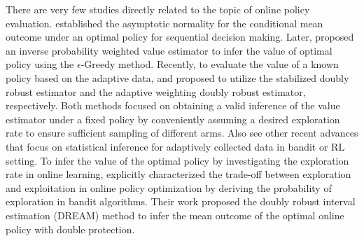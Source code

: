 There are very few studies directly related to the topic of online policy evaluation. \cite{chambaz2017targeted} established the asymptotic normality for the conditional mean outcome under an optimal policy for sequential decision making.  Later, \cite{chen2020statistical} proposed an inverse probability weighted value estimator to infer the value of optimal policy using the $\epsilon$-Greedy method. %
Recently, to evaluate the value of a known policy based on the adaptive data, %
\citet{bibaut2021post} and \citet{zhan2021off} proposed to utilize the stabilized doubly robust estimator and the adaptive weighting doubly robust estimator, respectively. Both methods focused on obtaining a valid inference of the value estimator under a fixed policy by conveniently assuming a desired exploration rate to ensure sufficient sampling of different arms. %
Also see other recent advances that focus on statistical inference for adaptively collected data \citep{dimakopoulou2021online,zhang2021statistical,khamaru2021near,ramprasad2022online} in bandit or \acrshort{RL} setting. 
To infer the value of the optimal policy by investigating the exploration rate in online learning, \citet{ye2023doubly} explicitly characterized the trade-off between exploration and exploitation in online policy optimization by deriving the probability of exploration in bandit algorithms. Their work 
proposed the doubly robust interval estimation (DREAM) method to infer the mean outcome of the optimal online policy with double protection.

